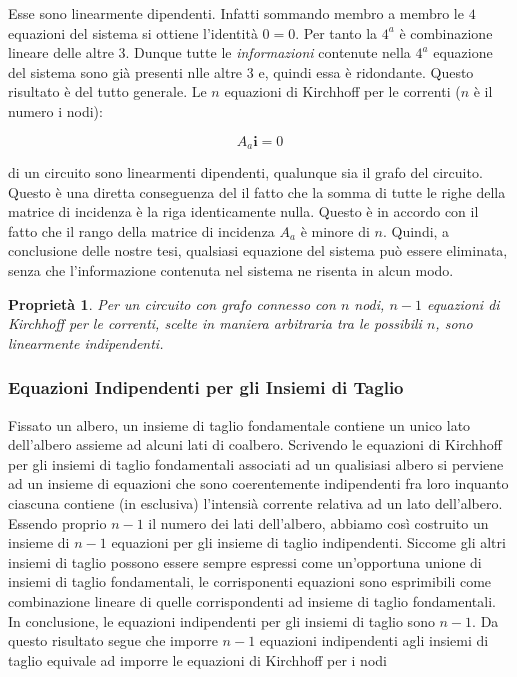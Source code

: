 \documentclass[a4paper]{report}
\newtheorem{prop}{Propriet\`a}
\begin{document}
Esse sono linearmente dipendenti. Infatti sommando membro a membro le
$4$ equazioni del sistema si ottiene l'identit\`a $0=0$. Per tanto la
$4^a$ \`e combinazione lineare delle altre $3$. Dunque tutte le
\emph{informazioni} contenute nella $4^a$ equazione del sistema sono
gi\`a presenti nlle altre $3$ e, quindi essa \`e ridondante.
Questo risultato \`e del tutto generale. Le $n$ equazioni di Kirchhoff
per le correnti ($n$ \`e il numero i nodi):

\[
A_a{\mathbf i}=0
\]

di un circuito sono linearmenti dipendenti, qualunque sia il grafo del
circuito. Questo \`e una diretta conseguenza del il fatto che la somma di tutte le
righe della matrice di incidenza \`e la riga identicamente
nulla. Questo \`e in accordo con il fatto che il rango della matrice
di incidenza $A_a$ \`e minore di $n$. Quindi, a conclusione delle
nostre tesi, qualsiasi equazione del sistema pu\`o essere eliminata,
senza che l'informazione contenuta nel sistema ne risenta in alcun
modo.

\begin{prop}
  Per un circuito con grafo connesso con $n$ nodi, $n-1$ equazioni di
  Kirchhoff per le correnti, scelte in maniera arbitraria tra le
  possibili $n$, sono linearmente indipendenti.
\end{prop}

\subsubsection{Equazioni Indipendenti per gli Insiemi di Taglio}
Fissato un albero, un insieme di taglio fondamentale contiene un unico
lato dell'albero assieme ad alcuni lati di coalbero. Scrivendo le
equazioni di Kirchhoff per gli insiemi di taglio fondamentali
associati ad un qualisiasi albero si perviene ad un insieme di
equazioni che sono coerentemente indipendenti fra loro inquanto
ciascuna contiene (in esclusiva) l'intensi\`a corrente relativa ad un
lato dell'albero. Essendo proprio $n-1$ il numero dei lati
dell'albero, abbiamo cos\`i costruito un insieme di $n-1$ equazioni
per gli insieme di taglio indipendenti. Siccome gli altri insiemi di
taglio possono essere sempre espressi come un'opportuna unione di
insiemi di taglio fondamentali, le corrisponenti equazioni sono
esprimibili come combinazione lineare di quelle corrispondenti ad
insieme di taglio fondamentali. In conclusione, le equazioni
indipendenti per gli insiemi di taglio sono $n-1$. Da questo risultato
segue che imporre $n-1$ equazioni indipendenti agli insiemi di taglio
equivale ad imporre le equazioni di Kirchhoff per i nodi
\end{document}
